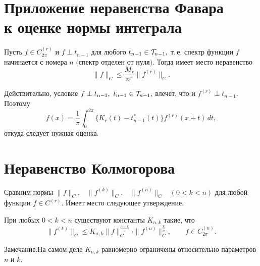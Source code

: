  \section{Приложение неравенства Фавара \\ к оценке
 нормы интеграла}



 \begin{teo}\label{t-Favard} %
 Пусть  $f\in C_{{2\pi}}^{(r)}$ и  $f\perp {t}_{n-1}$ для любого
 {$t_{n-1}\in {\cal T}_{n-1},$}  т.\,е. спектр функции {$f$} начинается с номера  $n$
 $($спектр отделен от нуля$)$. Тогда имеет место неравенство
 $$
 \|f\|_C\le \frac{M_r}{n^r} \|f^{(r)}\|_C.
 $$
 \end{teo}

Действительно, условие $f\perp {t}_{n-1},\ t_{n-1}\in {\cal T}_{n-1},$
влечет, что и $f^{(r)}\perp {t}_{n-1}.$ Поэтому
 $$
 f(x)=\frac{1}{\pi}\int_0^{2\pi}\{ K_r(t)-t_{n-1}^*(t)\} f^{(r)}(x+t)\, dt,
 $$
 откуда следует нужная оценка.

 \section{Неравенство Колмогорова}

 Сравним нормы $\|f\|_C,$~ $\|f^{(k)}\|_C,$~ $\|f^{(n)}\|_C$~ $(0<k<n)$
 для любой   функции $f\in C^{(r)}.$
 {Имеет место} следующее утверждение.

 \begin{teo}\label{t19-4}
 При любых $0<k<n$ существуют константы $K_{n,k}$ такие, что
 $$
 \|f^{(k)}\|_C\le K_{n,k}\|f\|^{\frac{n-k}{n}}_C\cdot
 \|f^{(n)}\|^{\frac{k}{n}}_C,\qquad f\in C_{{2\pi}}^{(n)}.
 $$
 \end{teo}

З\;а\;м\;е\;ч\;а\;н\;и\;е.\quad На самом деле $K_{n,k}$ равномерно ограничены
относительно параметров $n$ и $k$.

